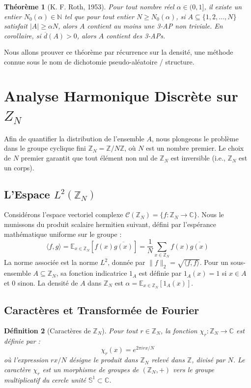 \documentclass[12pt, a4paper]{article}
\newtheorem{theorem}{Théorème}[section]
\newtheorem{definition}[theorem]{Définition}
\begin{document}
\begin{theorem}[K. F. Roth, 1953]
\label{thm:roth}
Pour tout nombre réel $\alpha \in (0, 1]$, il existe un entier $N_0(\alpha) \in \mathbb{N}$ tel que pour tout entier $N \geq N_0(\alpha)$, si $A \subseteq \{1, 2, \dots, N\}$ satisfait $|A| \geq \alpha N$, alors $A$ contient au moins une 3-AP non triviale.
En corollaire, si $\overline{d}(A) > 0$, alors $A$ contient des 3-APs.
\end{theorem}

Nous allons prouver ce théorème par récurrence sur la densité, une méthode connue sous le nom de dichotomie pseudo-aléatoire / structure.

\section{Analyse Harmonique Discrète sur $Z_N$}

Afin de quantifier la distribution de l'ensemble $A$, nous plongeons le problème dans le groupe cyclique fini $\mathbb{Z}_N = \mathbb{Z}/N\mathbb{Z}$, où $N$ est un nombre premier. Le choix de $N$ premier garantit que tout élément non nul de $\mathbb{Z}_N$ est inversible (i.e., $\mathbb{Z}_N$ est un corps).

\subsection{L'Espace $L^2(\mathbb{Z}_N)$}
Considérons l'espace vectoriel complexe $\mathcal{C}(\mathbb{Z}_N) = \{f : \mathbb{Z}_N \to \mathbb{C}\}$. Nous le munissons du produit scalaire hermitien suivant, défini par l'espérance mathématique uniforme sur le groupe :
\begin{equation}
\langle f, g \rangle = \mathbb{E}_{x \in \mathbb{Z}_N} [f(x) \overline{g(x)}] = \frac{1}{N} \sum_{x \in \mathbb{Z}_N} f(x) \overline{g(x)}
\end{equation}
La norme associée est la norme $L^2$, donnée par $\|f\|_2 = \sqrt{\langle f, f \rangle}$.
Pour un sous-ensemble $A \subseteq \mathbb{Z}_N$, sa fonction indicatrice $1_A$ est définie par $1_A(x) = 1$ si $x \in A$ et $0$ sinon. La densité de $A$ dans $\mathbb{Z}_N$ est $\alpha = \mathbb{E}_{x \in \mathbb{Z}_N} [1_A(x)]$.

\subsection{Caractères et Transformée de Fourier}
\begin{definition}[Caractères de $\mathbb{Z}_N$]
Pour tout $r \in \mathbb{Z}_N$, la fonction $\chi_r : \mathbb{Z}_N \to \mathbb{C}$ est définie par :
\begin{equation}
\chi_r(x) = e^{2\pi i r x / N}
\end{equation}
où l'expression $rx / N$ désigne le produit dans $\mathbb{Z}_N$ relevé dans $\mathbb{Z}$, divisé par $N$. Le caractère $\chi_r$ est un morphisme de groupes de $(\mathbb{Z}_N, +)$ vers le groupe multiplicatif du cercle unité $\mathbb{S}^1 \subset \mathbb{C}$.
\end{definition}
\end{document}
